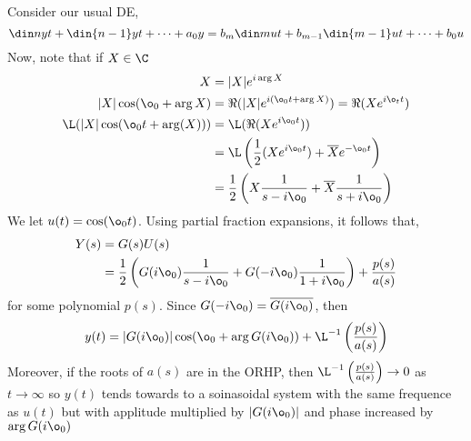 Consider our usual DE,
$$ \din n y t + \din {n-1} y t + \dots + a_0y = b_m\din m u t + b_{m-1}\din {m-1} u t + \dots + b_0u$$
Now, note that if $X \in \C$
\begin{align*}
  X &= |X| e^{i \arg{X}}\\
  |X|\cos (\o_0 + \arg X) &= \Re (|X|e^{i (\o_0t + \arg X)}) = \Re (Xe^{i\o_t t})\\
  \L(|X|\cos (\o_0 t + \arg(X))) &= \L(\Re (Xe^{i \o_0 t})) \\
  &= \L\left(\frac{1}{2} (Xe^{i\o_0 t}) + \overline{X} e^{-\o_0 t}\right) \\
  &= \frac{1}{2} \left(X \frac{1}{s - i\o_0} + \overline{X} \frac{1}{s + i\o_0}\right)
\end{align*}
We let $u(t) = \cos (\o_0 t)$. Using partial fraction expansions, it follows that,
\begin{align*}
  Y(s) &= G(s)U(s)\\
  &= \frac{1}{2}\left(G(i\o_0) \frac{1}{s - i\o_0} + G(-i\o_0)\frac{1}{1 + i\o_0}\right) + \frac{p(s)}{a(s)}
\end{align*}
for some polynomial $p(s)$. Since $G(-i\o_0) = \overline{G(i\o_0)}$, then
$$ y(t) = |G(i\o_0)|\cos (\o_0 + \arg G(i\o_0)) + \L^{-1} \left( \frac{p(s)}{a(s)} \right) $$
Moreover, if the roots of $a(s)$ are in the ORHP, then $\L^{-1} \left( \frac{p(s)}{a(s)} \right) \to 0$ as $t \to \infty$ so $y(t)$ tends towards to a soinasoidal system with the same frequence as $u(t)$ but with applitude multiplied by $|G(i\o_0)|$ and phase increased by $\arg G(i\o_0)$
